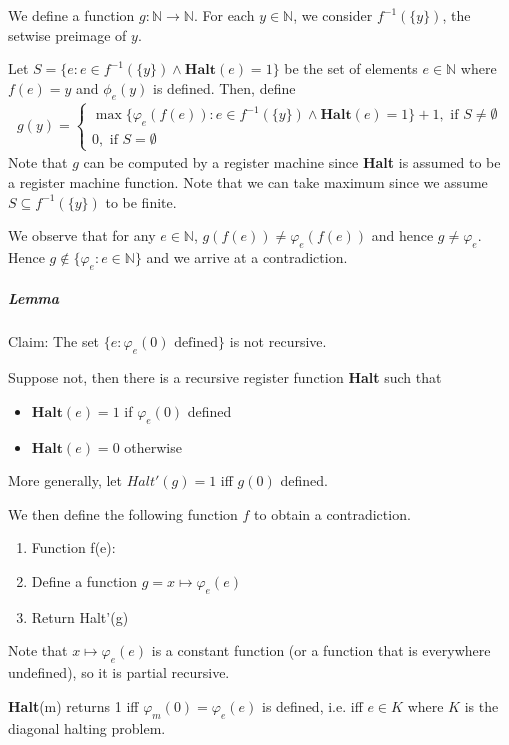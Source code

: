 \documentclass{article}
\begin{document}
We define a function $g:\mathbb{N}\rightarrow \mathbb{N}$. For each $y\in \mathbb{N}$, we consider $f^{-1}(\{y\})$, the setwise preimage of $y$.

Let $S=\{e : e\in f^{-1}(\{y\}) \land \mathbf{Halt}(e)=1\}$ be the set of elements $e\in \mathbb{N}$ where $f(e) = y$ and $\phi_e(y)$ is defined. Then, define
\begin{align*}
	g(y)=
	\begin{cases}
		\max \{\varphi_e(f(e)) : e\in f^{-1}(\{y\}) \land \mathbf{Halt}(e)=1\} + 1, \text{ if } S\neq \emptyset \\
		0, \text{ if } S=\emptyset 
	\end{cases}
\end{align*}
Note that $g$ can be computed by a register machine since \textbf{Halt} is assumed to be a register machine function. Note that we can take maximum since we assume $S\subseteq f^{-1}(\{y\})$ to be finite.

We observe that for any $e\in \mathbb{N}$, $g(f(e))\neq \varphi_e(f(e))$ and hence $g\neq \varphi_e$. Hence $g\notin \{\varphi_e : e\in \mathbb{N}\}$ and we arrive at a contradiction.

\subparagraph{Lemma} Claim: The set $\{e:\varphi_e(0) \text{ defined}\}$ is not recursive.

Suppose not, then there is a recursive register function \textbf{Halt} such that 
\begin{itemize}
	\item $\mathbf{Halt}(e) = 1$ if $\varphi_e(0)$ defined
	\item $\mathbf{Halt}(e) = 0$ otherwise
\end{itemize}

More generally, let $Halt'(g) = 1$ iff $g(0)$ defined.

We then define the following function $f$ to obtain a contradiction.
\begin{enumerate}
	\item Function f(e):
	\item Define a function $g = x\mapsto \varphi_e(e)$
	\item Return Halt'(g)
\end{enumerate}
Note that $x\mapsto \varphi_e(e)$ is a constant function (or a function that is everywhere undefined), so it is partial recursive.

\textbf{Halt}(m) returns 1 iff $\varphi_m(0) = \varphi_e(e)$ is defined, i.e. iff $e\in K$ where $K$ is the diagonal halting problem.
\end{document}

